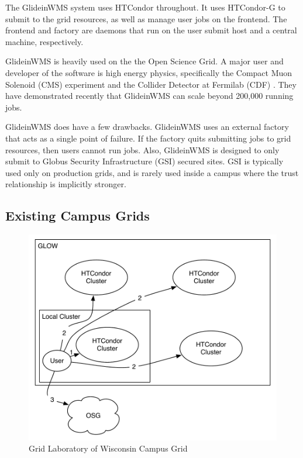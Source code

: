 The GlideinWMS system uses HTCondor throughout.  It uses HTCondor-G \cite{frey2002condor} to submit to the grid resources, as well as manage user jobs on the frontend.  The frontend and factory are daemons that run on the user submit host and a central machine, respectively.  
 
GlideinWMS is heavily used on the the Open Science Grid.  A major user and developer of the software is high energy physics, specifically the Compact Muon Solenoid (CMS) experiment \cite{bradley2010use} and the Collider Detector at Fermilab (CDF) \cite{zvada2010cdf}.  They have demonstrated recently that GlideinWMS can scale beyond 200,000 running jobs.
 
GlideinWMS does have a few drawbacks.  GlideinWMS uses an external factory that acts as a single point of failure.  If the factory quits submitting jobs to grid resources, then users cannot run jobs.  Also, GlideinWMS is designed to only submit to Globus Security Infrastructure (GSI) secured sites.  GSI is typically used only on production grids, and is rarely used inside a campus where the trust relationship is implicitly stronger.  



\subsection{Existing Campus Grids}



\begin{figure}[h!t]
	\centering
	\includegraphics[scale=0.6]{images/GLOW-Campus}
	\caption{Grid Laboratory of Wisconsin Campus Grid}
	\label{fig:GLOWCampus}
\end{figure}


